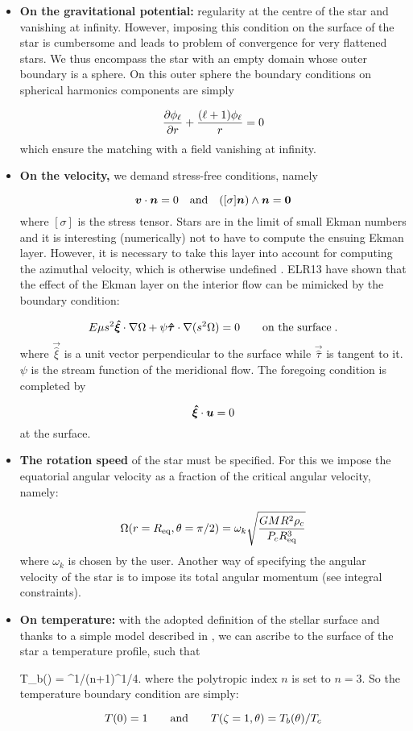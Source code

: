 \begin{itemize}
\item {\bf On the gravitational potential:} regularity at the centre of the
star and vanishing at infinity. However, imposing this condition on the
surface of the star is cumbersome and leads to problem of convergence
for very flattened stars. We thus encompass the star with an empty
domain whose outer boundary is a sphere. On this outer sphere the
boundary conditions on spherical harmonics components are simply

\[ 
\frac{\partial \phi_\ell}{\partial r}+\frac{(\ell+1)\phi_\ell}{r}=0
\]
which ensure the matching with a field vanishing at infinity.

\item {\bf On the velocity,} we demand stress-free conditions, namely

\[ \vv\cdot \vn =0 \quad {\rm and}\quad ([\sigma]\vn)\wedge\vn =\vzero
\]
where $[\sigma]$ is the stress tensor. Stars are in the limit of
small Ekman numbers and it is interesting (numerically) not to have to
compute the ensuing Ekman layer. However, it is necessary to take this
layer into account for computing the azimuthal velocity, which
is otherwise undefined \cite[e.g.][hereafter referred to as
ELR13]{ELR13}. ELR13 have shown that the effect of the Ekman layer on
the interior flow can be mimicked by the boundary condition:

\begin{equation}
\label{eq:bl}
E\mu
s^2\vec{\hat\xi}\cdot\na\Omega+\psi\vec{\hat\tau}\cdot\na(s^2\Omega)=0
\qquad\mbox{on the surface}\;.
\end{equation}
where $\vec{\hat\xi}$ is a unit vector perpendicular to the surface
while $\vec{\hat\tau}$ is tangent to it. $\psi$ is the stream
function of the meridional flow. The foregoing condition is completed by

\[ \vec{\hat\xi}\cdot\vu = 0\]
at the surface.

\item {\bf The rotation speed} of the star must be specified. For this we
impose the equatorial angular velocity as a fraction of the critical
angular velocity, namely:

\[ \Omega(r=R_{\rm eq},\theta=\pi/2) =
\omega_k\sqrt{\frac{GMR^2\rho_c}{P_cR_{\rm eq}^3}}\]
where $\omega_k$ is chosen by the user. Another way of specifying the
angular velocity of the star is to impose its total angular momentum
(see integral constraints).

\item {\bf On temperature:} with the adopted definition of the stellar surface
and thanks to a simple model described in \cite{ELR13}, we can ascribe
to the surface of the star a temperature profile, such that

\beq T_b(\theta) = \lp{}\rp^{1/(n+1)}\lp{}\rp^{1/4}\;.
where the polytropic index $n$ is set to $n=3$. So the temperature
boundary condition are simply:

\[ T(0) = 1 \andet T(\zeta=1,\theta)=T_b(\theta)/T_c\]


\end{itemize}

